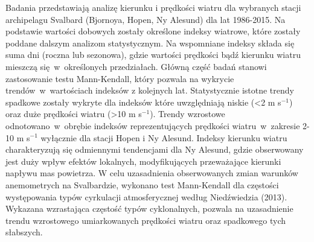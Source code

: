 \documentclass[\main/boa.tex]{subfiles}
\begin{document}
Badania przedstawiają analizę kierunku i prędkości wiatru dla wybranych stacji archipelagu Svalbard (Bjornoya, Hopen, Ny Alesund) dla lat 1986-2015. Na podstawie wartości dobowych zostały określone indeksy wiatrowe, które zostały poddane dalszym analizom statystycznym. Na wspomniane indeksy składa się suma dni (roczna lub sezonowa), gdzie wartości prędkości bądź kierunku wiatru mieszczą się~w~określonych przedziałach. Główną część badań stanowi zastosowanie testu Mann-Kendall, który pozwala na wykrycie trendów~w~wartościach indeksów z kolejnych lat. Statystycznie istotne trendy spadkowe zostały wykryte dla indeksów które uwzględniają niskie (<2 m s$^{-1}$) oraz duże prędkości wiatru (>10 m s$^{-1}$). Trendy wzrostowe odnotowano~w~obrębie indeksów reprezentujących prędkości wiatru~w~zakresie 2-10 m s$^{-1}$ wyłącznie dla stacji Hopen i Ny Alesund. Indeksy kierunku wiatru charakteryzują się odmiennymi tendencjami dla Ny Alesund, gdzie obserwowany jest duży wpływ efektów lokalnych, modyfikujących przeważające kierunki napływu mas powietrza. W celu uzasadnienia obserwowanych zmian warunków anemometrych na Svalbardzie, wykonano test Mann-Kendall dla częstości występowania typów cyrkulacji atmosferycznej według Niedźwiedzia (2013). Wykazana wzrastająca częstość typów cyklonalnych, pozwala na uzasadnienie trendu wzrostowego umiarkowanych prędkości wiatru oraz spadkowego tych słabszych. 
\end{document}
